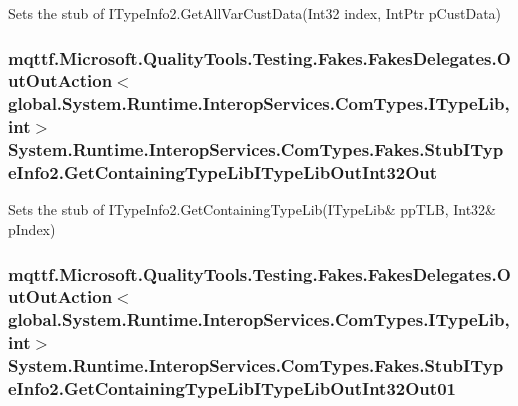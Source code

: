 Sets the stub of I\-Type\-Info2.\-Get\-All\-Var\-Cust\-Data(\-Int32 index, Int\-Ptr p\-Cust\-Data)

\hypertarget{class_system_1_1_runtime_1_1_interop_services_1_1_com_types_1_1_fakes_1_1_stub_i_type_info2_a23991adcb40eeae45bed7cef84335626}{
\subsubsection[{Get\-Containing\-Type\-Lib\-I\-Type\-Lib\-Out\-Int32\-Out}]{\setlength{\rightskip}{0pt plus 5cm}mqttf.\-Microsoft.\-Quality\-Tools.\-Testing.\-Fakes.\-Fakes\-Delegates.\-Out\-Out\-Action$<$global.\-System.\-Runtime.\-Interop\-Services.\-Com\-Types.\-I\-Type\-Lib, int$>$ System.\-Runtime.\-Interop\-Services.\-Com\-Types.\-Fakes.\-Stub\-I\-Type\-Info2.\-Get\-Containing\-Type\-Lib\-I\-Type\-Lib\-Out\-Int32\-Out}}\label{class_system_1_1_runtime_1_1_interop_services_1_1_com_types_1_1_fakes_1_1_stub_i_type_info2_a23991adcb40eeae45bed7cef84335626}


Sets the stub of I\-Type\-Info2.\-Get\-Containing\-Type\-Lib(I\-Type\-Lib\& pp\-T\-L\-B, Int32\& p\-Index)

\hypertarget{class_system_1_1_runtime_1_1_interop_services_1_1_com_types_1_1_fakes_1_1_stub_i_type_info2_a15a72f5585370e2b4340feaf26348102}{
\subsubsection[{Get\-Containing\-Type\-Lib\-I\-Type\-Lib\-Out\-Int32\-Out01}]{\setlength{\rightskip}{0pt plus 5cm}mqttf.\-Microsoft.\-Quality\-Tools.\-Testing.\-Fakes.\-Fakes\-Delegates.\-Out\-Out\-Action$<$global.\-System.\-Runtime.\-Interop\-Services.\-Com\-Types.\-I\-Type\-Lib, int$>$ System.\-Runtime.\-Interop\-Services.\-Com\-Types.\-Fakes.\-Stub\-I\-Type\-Info2.\-Get\-Containing\-Type\-Lib\-I\-Type\-Lib\-Out\-Int32\-Out01}}\label{class_system_1_1_runtime_1_1_interop_services_1_1_com_types_1_1_fakes_1_1_stub_i_type_info2_a15a72f5585370e2b4340feaf26348102}



